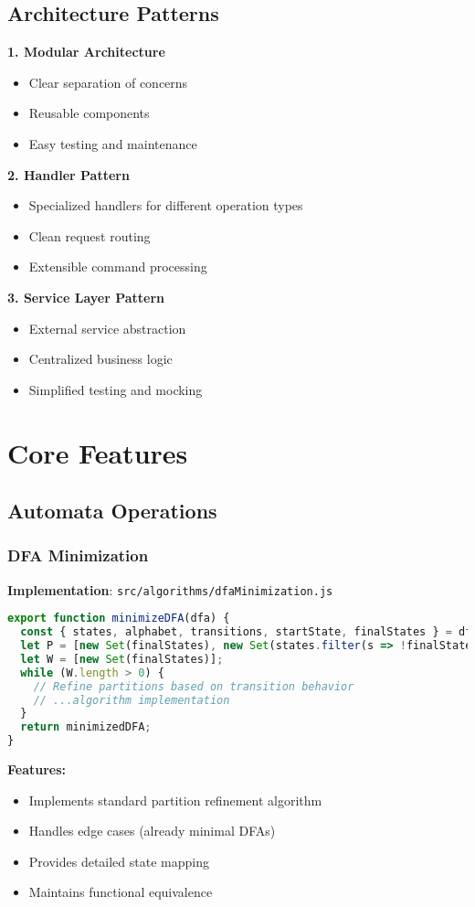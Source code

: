 \documentclass[12pt]{article}
\begin{document}
\subsection{Architecture Patterns}
\textbf{1. Modular Architecture}
\begin{itemize}
    \item Clear separation of concerns
    \item Reusable components
    \item Easy testing and maintenance
\end{itemize}
\textbf{2. Handler Pattern}
\begin{itemize}
    \item Specialized handlers for different operation types
    \item Clean request routing
    \item Extensible command processing
\end{itemize}
\textbf{3. Service Layer Pattern}
\begin{itemize}
    \item External service abstraction
    \item Centralized business logic
    \item Simplified testing and mocking
\end{itemize}

\section{Core Features}

\subsection{Automata Operations}

\subsubsection{DFA Minimization}
\textbf{Implementation}: \texttt{src/algorithms/dfaMinimization.js}
\begin{lstlisting}[language=JavaScript]
export function minimizeDFA(dfa) {
  const { states, alphabet, transitions, startState, finalStates } = dfa;
  let P = [new Set(finalStates), new Set(states.filter(s => !finalStates.includes(s)))];
  let W = [new Set(finalStates)];
  while (W.length > 0) {
    // Refine partitions based on transition behavior
    // ...algorithm implementation
  }
  return minimizedDFA;
}
\end{lstlisting}
\textbf{Features:}
\begin{itemize}
    \item Implements standard partition refinement algorithm
    \item Handles edge cases (already minimal DFAs)
    \item Provides detailed state mapping
    \item Maintains functional equivalence
\end{itemize}
\end{document}

